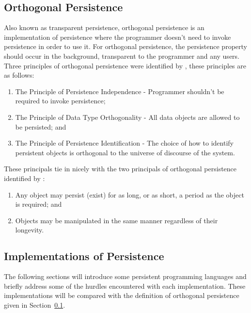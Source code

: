 \documentclass[a4paper,12pt]{article}
\begin{document}
\subsection{Orthogonal Persistence}\label{sec:orthogonal}
Also known as transparent persistence, orthogonal persistence is an implementation of persistence where the programmer doesn't need to invoke persistence in order to use it. For orthogonal persistence, the persistence property should occur in the background, transparent to the programmer and any users.
Three principles of orthogonal persistence were identified by \citet{Atkinson}, these principles are as follows:
\begin{enumerate}
    \item{The Principle of Persistence Independence - Programmer shouldn't be required to invoke persistence;}
    \item{The Principle of Data Type Orthogonality - All data objects are allowed to be persisted; and}
    \item{The Principle of Persistence Identification - The choice of how to identify persistent objects is orthogonal to the universe of discourse of the system.}
\end{enumerate}
These principals tie in nicely with the two principals of orthogonal persistence identified by \citet{Grasshopper}:
\begin{enumerate}
    \item{Any object may persist (exist) for as long, or as short, a period as the object is required; and}
    \item{Objects may be manipulated in the same manner regardless of their longevity.}
\end{enumerate}
\subsection{Implementations of Persistence}\label{sec:persistentLanguages}
The following sections will introduce some persistent programming languages and briefly address some of the hurdles encountered with each implementation. These implementations will be compared with the definition of orthogonal persistence given in Section~\ref{sec:orthogonal}.
\end{document}
